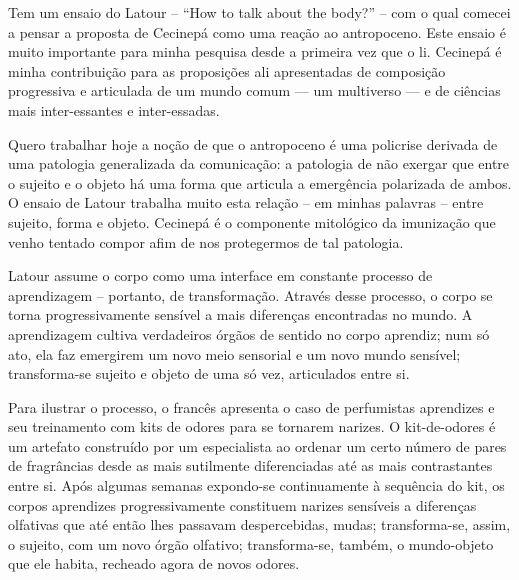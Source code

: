 Tem um ensaio do Latour -- \enquote{How to talk about the body?} -- com o qual comecei a pensar a proposta de Cecinepá como uma reação ao antropoceno. Este ensaio é muito importante para minha pesquisa desde a primeira vez que o li. Cecinepá é minha contribuição para as proposições ali apresentadas de composição progressiva e articulada de um mundo comum --- um multiverso --- e de ciências mais inter-essantes e inter-essadas.

Quero trabalhar hoje a noção de que o antropoceno é uma policrise derivada de uma patologia generalizada da comunicação: a patologia de não exergar que entre o sujeito e o objeto há uma forma que articula a emergência polarizada de ambos. O ensaio de Latour trabalha muito esta relação -- em minhas palavras -- entre sujeito, forma e objeto. Cecinepá é o componente mitológico da imunização que venho tentado compor afim de nos protegermos de tal patologia.

Latour assume o corpo como uma interface em constante processo de aprendizagem -- portanto, de transformação. Através desse processo, o corpo se torna progressivamente sensível a mais diferenças encontradas no mundo. A aprendizagem cultiva verdadeiros órgãos de sentido no corpo aprendiz; num só ato, ela faz emergirem um novo meio sensorial e um novo mundo sensível; transforma-se sujeito e objeto de uma só vez, articulados entre si.

Para ilustrar o processo, o francês apresenta o caso de perfumistas aprendizes e seu treinamento com kits de odores para se tornarem narizes. O kit-de-odores é um artefato construído por um especialista ao ordenar um certo número de pares de fragrâncias desde as mais sutilmente diferenciadas até as mais contrastantes entre si. Após algumas semanas expondo-se continuamente à sequência do kit, os corpos aprendizes progressivamente constituem narizes sensíveis a diferenças olfativas que até então lhes passavam despercebidas, mudas; transforma-se, assim, o sujeito, com um novo órgão olfativo; transforma-se, também, o mundo-objeto que ele habita, recheado agora de novos odores.

